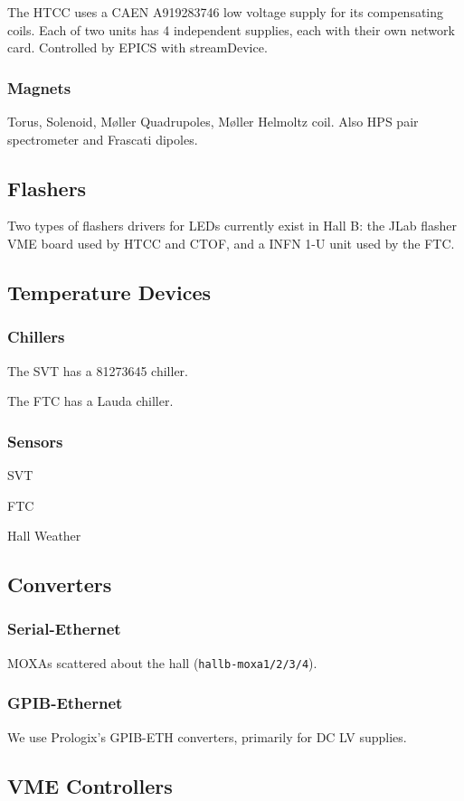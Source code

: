 \documentclass[amsmath,amssymb,notitlepage,11pt]{revtex4}
\begin{document}
The HTCC uses a CAEN A919283746 low voltage supply for its compensating coils.  Each of two units has 4 independent supplies, each with their own network card.  Controlled by EPICS with streamDevice.

\subsubsection{Magnets}
Torus, Solenoid, M\o ller Quadrupoles, M\o ller Helmoltz coil.  Also HPS pair spectrometer and Frascati dipoles.

\subsection{Flashers}
Two types of flashers drivers for LEDs currently exist in Hall B:  the JLab flasher VME board used by HTCC and CTOF, and a INFN 1-U unit used by the FTC.

\subsection{Temperature Devices}
\subsubsection{Chillers}
The SVT has a 81273645 chiller.

The FTC has a Lauda chiller.
\subsubsection{Sensors}
SVT

FTC

Hall Weather

\subsection{Converters}
\subsubsection{Serial-Ethernet}
MOXAs scattered about the hall (\texttt{hallb-moxa1/2/3/4}).
\subsubsection{GPIB-Ethernet}
We use Prologix's GPIB-ETH converters, primarily for DC LV supplies.

\subsection{VME Controllers}
\end{document}
